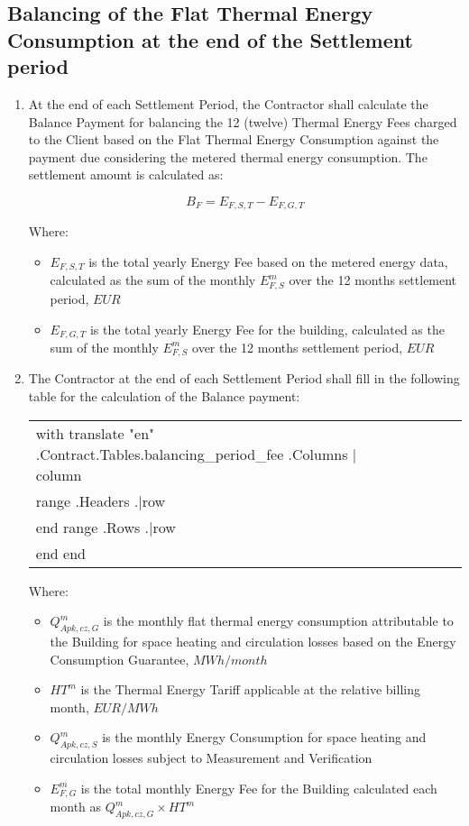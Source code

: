 \subsection{Balancing of the Flat Thermal Energy Consumption at the end of the Settlement period}
\begin{enumerate}
	\item At the end of each Settlement Period, the Contractor shall calculate the Balance Payment for balancing the 12 (twelve) Thermal Energy Fees charged to the Client based on the Flat Thermal Energy Consumption against the payment due considering the metered thermal energy consumption. The settlement amount is calculated as:

\[ B_F = E_{F,S,T} - E_{F,G,T} \]

Where:

\begin{itemize}
	\item $E_{F,S,T}$ is the total yearly Energy Fee based on the metered energy data, calculated as the sum of the monthly $E^{m}_{F,S}$  over the 12 months settlement period, $EUR$
	\item $E_{F,G,T}$ is the total yearly Energy Fee for the building, calculated as the sum of the monthly $E^{m}_{F,S}$  over the 12 months settlement period, $EUR$
\end{itemize}

	\item The Contractor at the end of each Settlement Period shall fill in the following table for the calculation of the Balance payment:


\begin{center}
\begin{tabu}{|X|X|X|X|X|X|X|} \tabucline{}
{{with translate "en" .Contract.Tables.balancing_period_fee}} %
	{{.Columns | column}} \\\tabucline{}
	{{range .Headers}} {{.|row}} \\\tabucline{} {{end}} %
	{{range .Rows}} {{.|row}} \\\tabucline{} {{end}} %
{{end}}
\end{tabu}
\end{center}

Where:

\begin{itemize}
	\item $Q^{m}_{Apk,cz,G}$ is the monthly flat thermal energy consumption attributable to the Building for space heating and circulation losses based on the Energy Consumption Guarantee, $MWh/month$
	\item $HT^m$ is the Thermal Energy Tariff applicable at the relative billing month, $EUR/MWh$
	\item $Q^m_{Apk,cz,S}$ is the monthly Energy Consumption for space heating and circulation losses subject to Measurement and Verification
	\item $E^m_{F,G}$ is the total monthly Energy Fee for the Building calculated each month as $Q^{m}_{Apk,cz,G} \times HT^{m}$
\end{itemize}


\end{enumerate}
